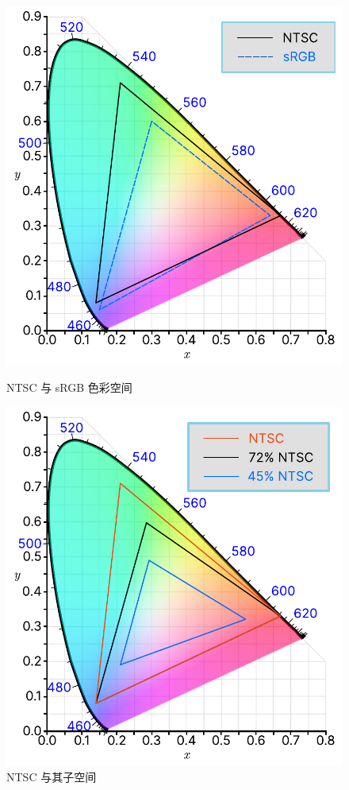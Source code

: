 \begin{figure}[htb!]
  \begin{minipage}{.49\textwidth}
    \centering
    \includegraphics[width=.8\textwidth]{assets/advanced/NTSC_sRGB.pdf}
    \caption{NTSC 与 sRGB 色彩空间}
    \label{fig:NTSC_sRGB}
  \end{minipage}
  \qquad
  \begin{minipage}{.49\textwidth}
  \centering
  \includegraphics[width=.8\textwidth]{assets/advanced/NTSC_72_45.pdf}
  \caption{NTSC 与其子空间}
  \label{fig:NTSC_72_45}
  \end{minipage}
\end{figure}

